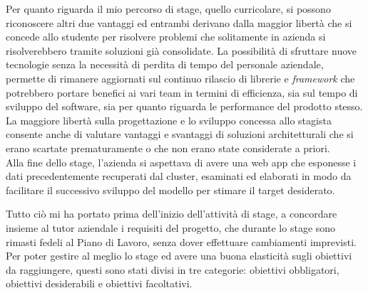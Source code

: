 Per quanto riguarda il mio percorso di stage, quello curricolare, si possono riconoscere altri due vantaggi ed entrambi derivano dalla maggior libertà che si concede allo studente per risolvere problemi che solitamente in azienda si risolverebbero tramite soluzioni già consolidate. La possibilità di sfruttare nuove tecnologie senza la necessità di perdita di tempo del personale aziendale, permette di rimanere aggiornati sul continuo rilascio di librerie e \textit{framework} che potrebbero portare benefici ai vari team in termini di efficienza, sia sul tempo di sviluppo del software, sia per quanto riguarda le performance del prodotto stesso.
La maggiore libertà sulla progettazione e lo sviluppo concessa allo stagista consente anche di valutare vantaggi e svantaggi di soluzioni architetturali che si erano scartate prematuramente o che non erano state considerate a priori.\\

Alla fine dello stage, l'azienda si aspettava di avere una \gls{web app} che esponesse i dati precedentemente recuperati dal \gls{cluster}, esaminati ed elaborati in modo da facilitare il successivo sviluppo del modello per stimare il target desiderato.

Tutto ciò mi ha portato prima dell'inizio dell'attività di stage, a concordare insieme al tutor aziendale i requisiti del progetto, che durante lo stage sono rimasti fedeli al Piano di Lavoro, senza dover effettuare cambiamenti imprevisti.
Per poter gestire al meglio lo stage ed avere una buona elasticità sugli obiettivi da raggiungere, questi sono stati divisi in tre categorie: obiettivi obbligatori, obiettivi desiderabili e obiettivi facoltativi.

